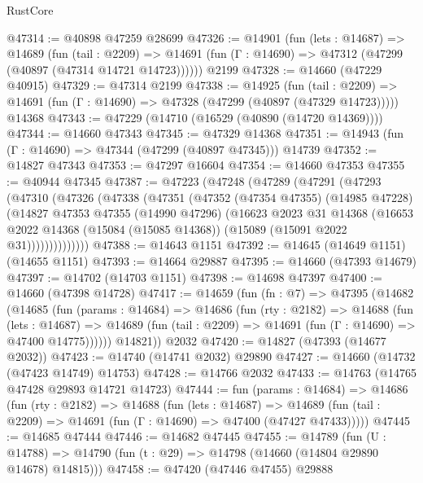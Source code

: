\begin{lexlean}{RustCore}
\begin{coremodule}
@47314 := @40898 @47259 @28699
@47326 := @14901
    (fun (lets : @14687) =>
    @14689
      (fun (tail : @2209) =>
      @14691 (fun (Γ : @14690) => @47312 (@47299 (@40897 (@47314 @14721 @14723))))))
    @2199
@47328 := @14660 (@47229 @40915)
@47329 := @47314 @2199
@47338 := @14925
    (fun (tail : @2209) => @14691 (fun (Γ : @14690) => @47328 (@47299 (@40897 (@47329 @14723)))))
    @14368
@47343 := @47229 (@14710 (@16529 (@40890 (@14720 @14369))))
@47344 := @14660 @47343
@47345 := @47329 @14368
@47351 := @14943 (fun (Γ : @14690) => @47344 (@47299 (@40897 @47345))) @14739
@47352 := @14827 @47343
@47353 := @47297 @16604
@47354 := @14660 @47353
@47355 := @40944 @47345
@47387 := @47223
    (@47248
      (@47289
        (@47291
          (@47293
            (@47310
              (@47326
                (@47338
                  (@47351
                    (@47352
                      (@47354 @47355)
                      (@14985 @47228)
                      (@14827
                        @47353
                        @47355
                        (@14990 @47296)
                        (@16623
                          @2023
                          @31
                          @14368
                          (@16653
                            @2022
                            @14368
                            (@15084 (@15085 @14368))
                            (@15089 (@15091 @2022 @31))))))))))))))
@47388 := @14643 @1151
@47392 := @14645 (@14649 @1151) (@14655 @1151)
@47393 := @14664 @29887
@47395 := @14660 (@47393 @14679)
@47397 := @14702 (@14703 @1151)
@47398 := @14698 @47397
@47400 := @14660 (@47398 @14728)
@47417 := @14659
    (fun (fn : @7) =>
    @47395
      (@14682
        (@14685
          (fun (params : @14684) =>
          @14686
            (fun (rty : @2182) =>
            @14688
              (fun (lets : @14687) =>
              @14689 (fun (tail : @2209) => @14691 (fun (Γ : @14690) => @47400 @14775))))))
        @14821))
    @2032
@47420 := @14827 (@47393 (@14677 @2032))
@47423 := @14740 (@14741 @2032) @29890
@47427 := @14660 (@14732 (@47423 @14749) @14753)
@47428 := @14766 @2032
@47433 := @14763 (@14765 @47428 @29893 @14721 @14723)
@47444 := fun (params : @14684) =>
  @14686
    (fun (rty : @2182) =>
    @14688
      (fun (lets : @14687) =>
      @14689 (fun (tail : @2209) => @14691 (fun (Γ : @14690) => @47400 (@47427 @47433)))))
@47445 := @14685 @47444
@47446 := @14682 @47445
@47455 := @14789
    (fun (U : @14788) => @14790 (fun (t : @29) => @14798 (@14660 (@14804 @29890 @14678) @14815)))
@47458 := @47420 (@47446 @47455) @29888

\end{coremodule}
\end{lexlean}
